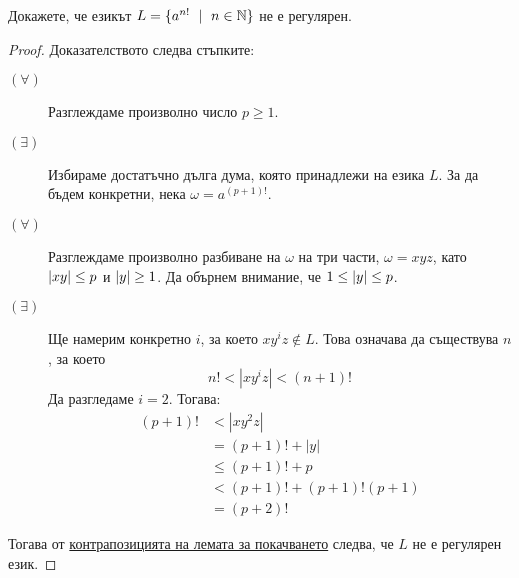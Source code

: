 \begin{extra}
\begin{problem}
  Докажете, че езикът $L = \{a^{n!}\ \mid\ n\in\Nat\}$ не е регулярен.  
\end{problem}
\begin{proof}
  Доказателството следва стъпките:
  \begin{description}
  \item[$(\forall)$]
    Разглеждаме произволно число $p \geq 1$.
  \item[$(\exists)$]
    Избираме достатъчно дълга дума, която принадлежи на езика $L$. 
    За да бъдем конкретни, нека $\omega = a^{(p+1)!}$.
  \item[$(\forall)$]
    Разглеждаме произволно разбиване на $\omega$ на три части, $\omega = xyz$, 
    като $\vert{xy}\vert \leq p$ и $\vert{y}\vert \geq 1$.
    Да обърнем внимание, че $1 \leq \vert{y}\vert \leq p$.
  \item[$(\exists)$]
    Ще намерим конкретно $i$, за което $xy^iz \not\in L$.
    Това означава да съществува $n$, за което
    \[n! < |xy^iz| < (n+1)!\]
    Да разгледаме $i = 2$. Тогава:
    \begin{align*}
      (p+1)! & < |xy^2z| \\
             & = (p+1)! + |y|\\
             & \leq (p+1)! + p \\
             & < (p+1)! + (p+1)!(p+1) \\
             & = (p+2)!
    \end{align*}
  \end{description}
  Тогава от \hyperref[cor:regular:pumping]{контрапозицията на лемата за покачването} следва, че $L$ не е регулярен език.  
\end{proof}


\end{extra}
